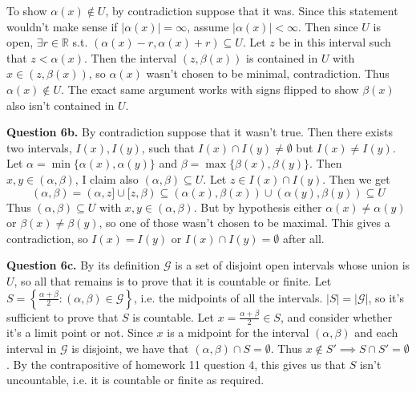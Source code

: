 \documentclass[letterpaper, reqno,11pt]{article}
\begin{document}
To show $\alpha(x)\notin U$, by contradiction suppose that it was. Since this statement wouldn't make sense if $|\alpha(x)|=\infty$, assume $|\alpha(x)|<\infty$. Then since $U$ is open, $\exists r\in \mathbb{R}$ s.t. $(\alpha(x)-r,\alpha(x)+r)\subseteq U$. Let $z$ be in this interval such that $z<\alpha(x)$. Then the interval $(z,\beta(x))$ is contained in $U$ with $x\in (z,\beta(x))$, so $\alpha(x)$ wasn't chosen to be minimal, contradiction. Thus $\alpha(x)\notin U$. The exact same argument works with signs flipped to show $\beta(x)$ also isn't contained in $U$.

{\medskip\noindent\bf Question 6b.} By contradiction suppose that it wasn't true. Then there exists two intervals, $I(x),I(y)$, such that $I(x)\cap I(y)\neq\emptyset$ but $I(x)\neq I(y)$. Let $\alpha=\min \{\alpha(x),\alpha(y)\}$ and $\beta=\max \{\beta(x),\beta(y)\}$. Then $x,y\in (\alpha,\beta)$, I claim also $(\alpha,\beta)\subseteq U$. Let $z\in I(x)\cap I(y)$. Then we get 
\[
(\alpha,\beta)=(\alpha,z]\cup [z,\beta)\subseteq (\alpha(x),\beta(x))\cup (\alpha(y),\beta(y))\subseteq U
\]
Thus $(\alpha,\beta)\subseteq U$ with $x,y\in(\alpha,\beta)$. But by hypothesis either $\alpha(x)\neq\alpha(y)$ or $\beta(x)\neq\beta(y)$, so one of those wasn't chosen to be maximal. This gives a contradiction, so $I(x)=I(y)$ or $I(x)\cap I(y)=\emptyset$ after all.

{\medskip\noindent\bf Question 6c.} By its definition $\mathcal G$ is a set of disjoint open intervals whose union is $U$, so all that remains is to prove that it is countable or finite. Let $S=\left\{\frac{\alpha+\beta}{2}: (\alpha,\beta)\in \mathcal G\right\}$, i.e. the midpoints of all the intervals. $|S|=|\mathcal G|$, so it's sufficient to prove that $S$ is countable. Let $x=\frac{\alpha+\beta}{2}\in S$, and consider whether it's a limit point or not. Since $x$ is a midpoint for the interval $(\alpha,\beta)$ and each interval in $\mathcal G$ is disjoint, we have that $(\alpha,\beta)\cap S=\emptyset$. Thus $x\notin S'\implies S\cap S'=\emptyset$. By the contrapositive of homework 11 question 4, this gives us that $S$ isn't uncountable, i.e. it is countable or finite as required.



\newpage\phantom{blabla}
\newpage
\end{document}
